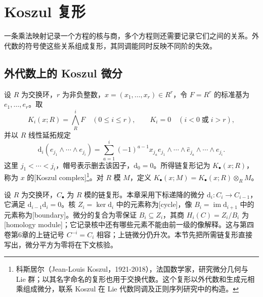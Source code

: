 
\section{Koszul 复形}
\label{b3:sec:1502}

一条乘法映射记录一个方程的核与商，多个方程则还需要记录它们之间的关系。外代数的符号使这些关系组成复形，其同调能同时反映不同阶的失效。


%
%

\subsection{外代数上的 Koszul 微分}
\label{b3:subsec:1502:01}

\begin{definition}\label{b3:def:koszul-complex}
	设 \(R\) 为交换环，\(r\) 为非负整数，\(x=(x_1,\ldots,x_r)\in R^r\)，令 \(F=R^r\) 的标准基为 \(e_1,\ldots,e_r\)。取
	\[
		K_i(x;R)=\bigwedge^i_RF\quad(0\le i\le r),\qquad K_i=0\quad(i<0\;\text{或}\;i>r),
	\]
	并以 \(R\) 线性延拓规定
	\begin{equation}\label{b3:eq:koszul-differential}
		\mathrm{d}_i(e_{j_1}\wedge\cdots\wedge e_{j_i}) =\sum_{a=1}^i(-1)^{a-1}x_{j_a} e_{j_1}\wedge\cdots\wedge\widehat e_{j_a}\wedge\cdots\wedge e_{j_i}.
	\end{equation}
	这里 \(j_1<\cdots<j_i\)，帽号表示删去该因子，\(\mathrm{d}_0=0\)。所得链复形记为 \(K_\bullet(x;R)\)，称为 \(x\) 的[Koszul complex]\footnote{科斯居尔（Jean-Louis Koszul，1921-2018），法国数学家，研究微分几何与 Lie 群；以其名字命名的复形也用于交换代数。这个复形以外代数和生成元相乘组成微分，联系 Koszul 在 Lie 代数同调及正则序列研究中的构造。}。对 \(R\) 模 \(M\)，定义 \(K_\bullet(x;M)=K_\bullet(x;R)\otimes_RM\)。
\end{definition}

设 \(R\) 为交换环，\(C_\bullet\) 为 \(R\) 模的链复形。本章采用下标递降的微分 \(\mathrm{d}_i:C_i\rightarrow C_{i-1}\)，它满足 \(\mathrm{d}_{i-1}\mathrm{d}_i=0\)。核 \(Z_i=\ker \mathrm{d}_i\) 中的元素称为[cycle]，像 \(B_i=\operatorname{im}\mathrm{d}_{i+1}\) 中的元素称为[boundary]。微分的复合为零保证 \(B_i\subseteq Z_i\)，其商 \(H_i(C)=Z_i/B_i\) 为[homology module]；它记录核中还有哪些元素不能由前一级的像解释。这与第四卷第6章的上链记号 \(C^{-i}=C_i\) 相容；上链微分仍升次。本节先把所需链复形直接写出，微分平方为零将在下文核验。

